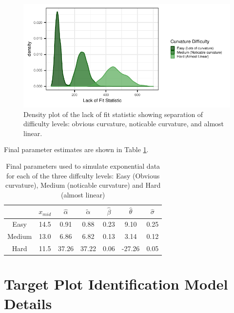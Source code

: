 \documentclass[]{interact}
\theoremstyle{plain}%
\theoremstyle{definition}
\theoremstyle{remark}
\begin{document}
\begin{figure}

{\centering \includegraphics{jsm-2021-student-paper-submission_files/figure-latex/lof-density-curves-1} 

}

\caption{Density plot of the lack of fit statistic showing separation of difficulty levels: obvious curvature, noticable curvature, and almost linear.}\label{fig:lof-density-curves}
\end{figure}

Final parameter estimates are shown in Table \ref{tab:parameter-data}.

\begin{table}

\caption{\label{tab:parameter-data}Final parameters used to simulate exponential data for each of the three diffculty levels: Easy (Obvious curvature), Medium (noticable curvature) and Hard (almost linear)}
\centering
\begin{tabular}[t]{ccccccc}
\toprule
 & $x_{mid}$ & $\hat\alpha$ & $\tilde\alpha$ & $\hat\beta$ & $\hat\theta$ & $\hat\sigma$\\
\midrule
Easy & 14.5 & 0.91 & 0.88 & 0.23 & 9.10 & 0.25\\
Medium & 13.0 & 6.86 & 6.82 & 0.13 & 3.14 & 0.12\\
Hard & 11.5 & 37.26 & 37.22 & 0.06 & -27.26 & 0.05\\
\bottomrule
\end{tabular}
\end{table}

\hypertarget{target-plot-identification-model-details}{%
\section{\texorpdfstring{Target Plot Identification Model Details
\label{app:glmm-model}}{Target Plot Identification Model Details }}\label{target-plot-identification-model-details}}
\end{document}
